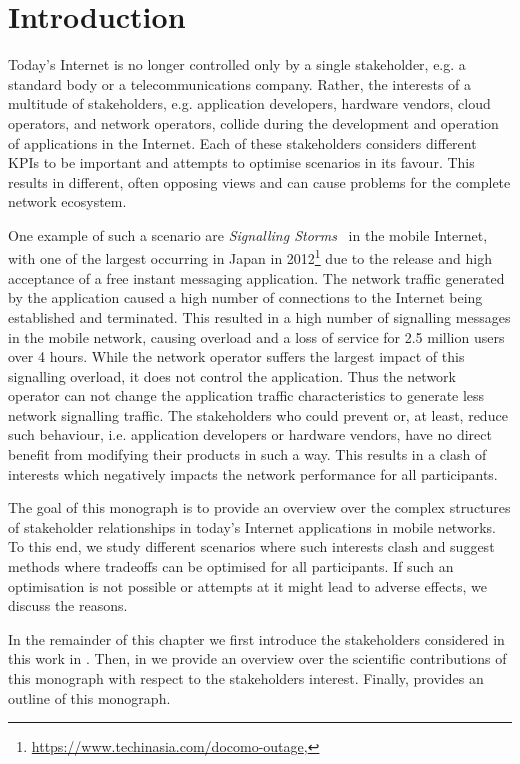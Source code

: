 \chapter{Introduction}\label{chap:introduction}

Today's Internet is no longer controlled only by a single stakeholder, e.g. a standard body or a telecommunications company.
Rather, the interests of a multitude of stakeholders, e.g. application developers, hardware vendors, cloud operators, and network operators, collide during the development and operation of applications in the Internet.
Each of these stakeholders considers different \glspl{KPI} to be important and attempts to optimise scenarios in its favour.
This results in different, often opposing views and can cause problems for the complete network ecosystem.

One example of such a scenario are \emph{Signalling Storms}~\cite{Huawei2011} in the mobile Internet, with one of the largest occurring in Japan in 2012\footnote{\url{https://www.techinasia.com/docomo-outage}, \accessed} due to the release and high acceptance of a free instant messaging application.
The network traffic generated by the application caused a high number of connections to the Internet being established and terminated.
This resulted in a high number of signalling messages in the mobile network, causing overload and a loss of service for 2.5 million users over 4 hours.
While the network operator suffers the largest impact of this signalling overload, it does not control the application.
Thus the network operator can not change the application traffic characteristics to generate less network signalling traffic.
The stakeholders who could prevent or, at least, reduce such behaviour, i.e. application developers or hardware vendors, have no direct benefit from modifying their products in such a way.
This results in a clash of interests which negatively impacts the network performance for all participants.

The goal of this monograph is to provide an overview over the complex structures of stakeholder relationships in today's Internet applications in mobile networks.
To this end, we study different scenarios where such interests clash and suggest methods where tradeoffs can be optimised for all participants.
If such an optimisation is not possible or attempts at it might lead to adverse effects, we discuss the reasons.

In the remainder of this chapter we first introduce the stakeholders considered in this work in .
Then, in  we provide an overview over the scientific contributions of this monograph with respect to the stakeholders interest.
Finally,  provides an outline of this monograph.

